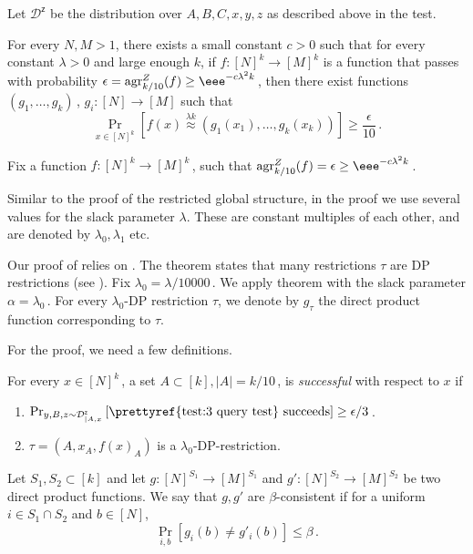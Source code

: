 \documentclass{toc}
\newcommand{\Prob}[2][]{\Pr_{{#1}}\left[#2\right]} %
\newcommand{\Brac}[1]{\left[#1\right]} %
\newcommand{\abs}[1]{\lvert#1\rvert} %
\newcommand\f{f} %
\newcommand{\g}{g} %
\newcommand\pf{g} %
\newcommand{\test}[2]{
	\ifx &#2&
	\textrm{agr}^{#1}
	\else	
	\textrm{agr}^{#1}_{#2}
	\fi}
\newcommand\neql[1]{\stackrel{{#1}}{ \approx}} %
\newcommand{\D}{\mathcal{D}^{\mathsf{z}}} %
\begin{document}
Let $\D$ be the distribution over $A,B,C,x,y,z$ as described above in the test.
\begin{theorem}
	For every $N,M>1$, there exists a small constant $c > 0$ such that for every constant $\lambda>0$ and large enough $k$, if $\f:[N]^k \rightarrow[M]^k$ is a function that passes  with probability  $\epsilon=\test{Z}{k/10}(\f) \geq \eee^{-c \lambda^2 k}$\,, then there exist functions $(\pf_1,\ldots, \pf_k)$\,, $\pf_i:[N]\rightarrow[M]$ such that
	\[\Prob[x\in\Brac{N}^k]{\f(x) \neql{\lambda k}( \pf_1(x_1),\ldots ,\pf_k(x_k))} \geq \frac{\epsilon}{10}\,.\]%
\end{theorem}

Fix a function $\f:[N]^k\rightarrow[M]^k$\,, such that $\test{Z}{k/10}(\f) =\epsilon\geq \eee^{-c \lambda^2 k}$\,.


Similar to the proof of the restricted global structure, in the proof we use several values for the slack parameter $\lambda$. These are constant multiples of each other, and are denoted by $\lambda_0,\lambda_1$ etc.


Our proof of  relies on . The theorem states that many restrictions $\tau$ are DP restrictions (see ). 
Fix $\lambda_0 = 
%
\lambda/10000$\,. %
We apply theorem  with the slack parameter $\alpha = \lambda_0$\,.
For every $\lambda_0$-DP restriction $\tau$, we denote by $\g_\tau$ the direct product function corresponding to $\tau$.


For the proof, we need a few definitions.

\begin{definition}
	For every $x\in[N]^k$\,, a set $A\subset[k],\abs{A} = k/10$\,, is \emph{successful} with respect to $x$ if
	\begin{enumerate}
		\item $\Prob[y,B,z\sim \D_{|A,x}]{\text{\prettyref{test:3 query test} succeeds}}\geq 
		\epsilon/3$\,. %
		\item $\tau = (A,x_A,\f(x)_A)$ is a $\lambda_0$-DP-restriction.
	\end{enumerate}
\end{definition}

\begin{definition}\label{def:consistent func}
    Let $S_1,S_2\subset [k]$ and let $\g:[N]^{S_1}\rightarrow[M]^{S_1}$ and $\g':[N]^{S_2}\rightarrow[M]^{S_2}$ be two direct product functions. We say that $\g,\g'$ are $\beta$-consistent if for a uniform $i\in S_1\cap S_2$ and $b\in [N]$,
	\[ \Prob[i,b]{\g_i(b)\neq \g'_i(b)} \leq \beta \,.\] %
\end{definition}
\end{document}
